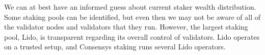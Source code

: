 \documentclass{article}
\begin{document}
We can at best have an informed guess about current staker wealth distribution.
Some staking pools can be identified, but even then we may not be aware of all
of the validator nodes and validators that they run. However, the largest
staking pool, Lido, is transparent regarding its overall control of validators.
Lido operates on a trusted setup, and Consensys staking runs several Lido
operators. 
%
%
%
%
\end{document}

